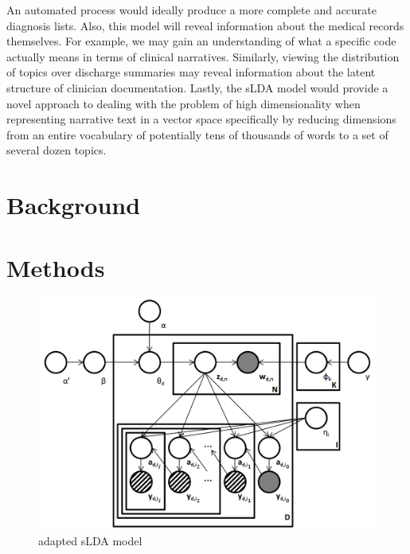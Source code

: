 \documentclass{article}
\begin{document}
An automated process would ideally produce a more complete and accurate
diagnosis lists. Also, this model will reveal information about the
medical records themselves. For example, we may gain an understanding
of what a specific code actually means in terms of clinical narratives.
Similarly, viewing the distribution of topics over discharge summaries
may reveal information about the latent structure of clinician documentation.
Lastly, the sLDA model would provide a novel approach to dealing with
the problem of high dimensionality when representing narrative text
in a vector space specifically by reducing dimensions from an entire
vocabulary of potentially tens of thousands of words to a set of several
dozen topics.


\section{Background}


\section{Methods}


%
\begin{figure}[h]
 \centering \includegraphics[scale=0.3]{Graphical_Model2} \caption{adapted sLDA model}


\label{fig:example} 
\end{figure}
\end{document}
